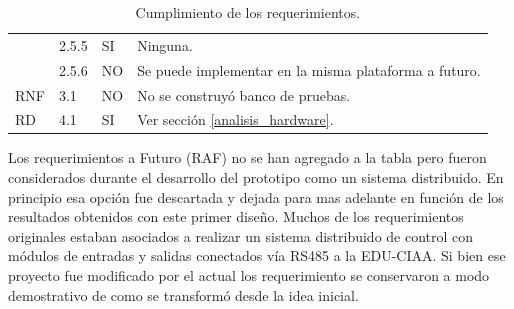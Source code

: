 \begin{table}[h!]
\begin{flushleft}
\begin{tabular}{|m{2.6cm}|m{1.5cm}|m{1.5cm}|m{6.8cm}|}
\multicolumn{1}{|l|}{} & { 2.5.5 } & { SI } & { Ninguna. }\\ \cline{ 2- 4} 
\multicolumn{1}{|l|}{} & { 2.5.6 } & { NO } & { Se puede implementar en la misma plataforma a futuro. }\\ \hline
\multicolumn{1}{|l|}{RNF} & { 3.1 } & { NO } & { No se construyó banco de pruebas. }\\ \hline 
\multicolumn{1}{|l|}{RD} & { 4.1 } & { SI } & { Ver sección \ref{analisis_hardware}.}\\ \hline 
\end{tabular}
\end{flushleft}
\caption{ Cumplimiento de los requerimientos.}
\label{tablas_cumplimiento_req}
\end{table}

Los requerimientos a Futuro (RAF) no se han agregado a la tabla pero fueron considerados durante el desarrollo del prototipo como un sistema distribuido. En principio esa opción fue descartada y dejada para mas adelante en función de los resultados obtenidos con este primer diseño.
Muchos de los requerimientos originales estaban asociados a realizar un sistema distribuido de control con módulos de entradas y salidas conectados vía RS485 a la EDU-CIAA. Si bien ese proyecto fue modificado por el actual los requerimiento se conservaron a modo demostrativo de como se transformó desde la idea inicial.